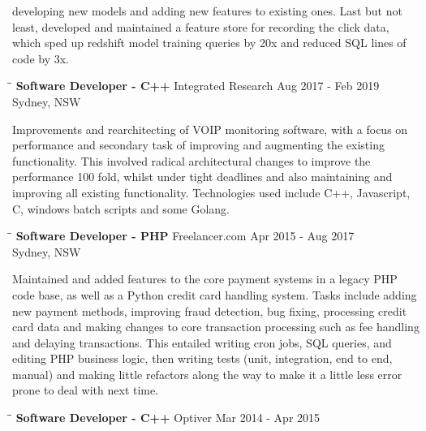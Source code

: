 \documentclass{res}
\begin{document}
\begin{resume}
    developing new models and adding new features to existing ones. Last but not least, developed
    and maintained a feature store for recording the click data, which sped up redshift model
    training queries by 20x and reduced SQL lines of code by 3x.
   \begin{tabbing}
   \hspace{2.3in}\= \hspace{2.6in}\= \kill %
    {\bf Software Developer - C++} \>Integrated Research \>Aug 2017 - Feb 2019\\
                                   \>Sydney, NSW
   \end{tabbing}\vspace{-20pt}      %
    Improvements and rearchitecting of VOIP monitoring software, with a focus on performance and
    secondary task of improving and augmenting the existing functionality. This involved radical
    architectural changes to improve the performance 100 fold, whilst under tight deadlines and
    also maintaining and improving all existing functionality. Technologies used include C++,
    Javascript, C, windows batch scripts and some Golang.
   \begin{tabbing}
   \hspace{2.3in}\= \hspace{2.6in}\= \kill %
    {\bf Software Developer - PHP} \>Freelancer.com \>Apr 2015 - Aug 2017\\
                                   \>Sydney, NSW
   \end{tabbing}\vspace{-20pt}      %
    Maintained and added features to the core payment systems in a legacy
    PHP code base, as well as a Python credit card handling system. Tasks
    include adding new payment methods, improving fraud detection, bug fixing,
    processing credit card data and making changes to core transaction
    processing such as fee handling and delaying transactions. This entailed
    writing cron jobs, SQL queries, and editing PHP business logic, then
    writing tests (unit, integration, end to end, manual) and making little
    refactors along the way to make it a little less error prone to deal with
    next time.
   \begin{tabbing}
   \hspace{2.3in}\= \hspace{2.6in}\= \kill %
    {\bf Software Developer - C++} \>Optiver \>Mar 2014 - Apr 2015\\

\end{tabbing}
\end{resume}
\end{document}
